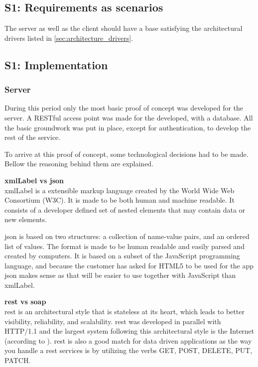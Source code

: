\documentclass[11pt]{book}
\begin{document}
\subsection{S1: Requirements as scenarios}
The server as well as the client should have a base satisfying the architectural drivers listed in \ref{sec:architecture_drivers}.

\subsection{S1: Implementation}

\subsubsection{Server}
During this period only the most basic proof of concept was developed for the server. A RESTful access point was made for the developed, with a database. All the basic groundwork was put in place, except for authentication, to develop the rest of the service.

To arrive at this proof of concept, some technological decisions had to be made. Bellow the reasoning behind them are explained.

\textbf{\gls{xmlLabel} vs \gls{json}}\\
\gls{xmlLabel} is a extensible markup language created by the World Wide Web Consortium (W3C). It is made to be both human and machine readable. It consists of a developer defined set of nested elements that may contain data or new elements.

\gls{json} \cite{json} is based on two structures: a collection of name-value pairs, and an ordered list of values. The format is made to be human readable and easily parsed and created by computers. It is based on a subset of the JavaScript programming language, and because the customer has asked for HTML5 to be used for the app \gls{json} makes sense as that will be easier to use together with JavaScript than \gls{xmlLabel}.

\textbf{\gls{rest} vs \gls{soap}}\\
\gls{rest} \cite{rest} is an architectural style that is stateless at its heart, which leads to better visibility, reliability, and scalability. \gls{rest} was developed in parallel with HTTP/1.1 and the largest system following this architectural style is the Internet (according to \cite{wikipedia:rest}). \gls{rest} is also a good match for data driven applications as the way you handle a \gls{rest} services is by utilizing the verbs GET, POST, DELETE, PUT, PATCH.
\end{document}
